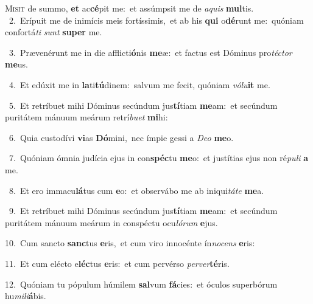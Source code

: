 \lettrine{\initial\textcolor{\initialcolor}{M}}{isit} de summo, \textbf{et} ac\-\textbf{cé}\-pit me:~\star et assúmpsit me de \textit{a}\-\textit{quis} \textbf{mul}\-tis.\\
{\numbfont\textcolor{\numbcolor}{~2.}}~Erípuit me de inimícis meis fortíssimis,~\dagger et ab his \textbf{qui} o\-\textbf{dé}\-runt me:~\star quóniam confortá\textit{ti} \textit{sunt} \textbf{su}\-\textbf{per} me.\par
{\numbfont\textcolor{\numbcolor}{~3.}}~Prævenérunt me in die afflicti\-\textbf{ó}\-nis \textbf{me}\-æ:~\star et factus est Dóminus pro\-\textit{téc}\-\textit{tor} \textbf{me}\-us.\par
{\numbfont\textcolor{\numbcolor}{~4.}}~Et edúxit me in \textbf{la}\-ti\-\textbf{tú}\-dinem:~\star salvum me fecit, quóniam \textit{vó}\-\textit{lu}\textbf{it} me.\par
{\numbfont\textcolor{\numbcolor}{~5.}}~Et retríbuet mihi Dóminus secúndum jus\-\textbf{tí}\-tiam \textbf{me}\-am:~\star et secúndum puritátem mánuum meárum retrí\-\textit{bu}\-\textit{et} \textbf{mi}\-hi:\par
{\numbfont\textcolor{\numbcolor}{~6.}}~Quia custodívi \textbf{vi}\-as \textbf{Dó}\-mini,~\star nec ímpie gessi a \textit{De}\-\textit{o} \textbf{me}\-o.\par
{\numbfont\textcolor{\numbcolor}{~7.}}~Quóniam ómnia judícia ejus in con\-\textbf{spéc}\-tu \textbf{me}\-o:~\star et justítias ejus non ré\-\textit{pu}\-\textit{li} \textbf{a} me.\par
{\numbfont\textcolor{\numbcolor}{~8.}}~Et ero immacu\-\textbf{lá}\-tus cum \textbf{e}\-o:~\star et observábo me ab iniqui\-\textit{tá}\-\textit{te} \textbf{me}\-a.\par
{\numbfont\textcolor{\numbcolor}{~9.}}~Et retríbuet mihi Dóminus secúndum jus\-\textbf{tí}\-tiam \textbf{me}\-am:~\star et secúndum puritátem mánuum meárum in conspéctu ocu\-\textit{ló}\-\textit{rum} \textbf{e}\-jus.\par
{\numbfont\textcolor{\numbcolor}{10.}}~Cum sancto \textbf{sanc}\-tus \textbf{e}\-ris,~\star et cum viro innocénte ín\-\textit{no}\-\textit{cens} \textbf{e}\-ris:\par
{\numbfont\textcolor{\numbcolor}{11.}}~Et cum elécto e\-\textbf{léc}\-tus \textbf{e}\-ris:~\star et cum pervérso \textit{per}\-\textit{ver}\textbf{té}ris.\par
{\numbfont\textcolor{\numbcolor}{12.}}~Quóniam tu pópulum húmilem \textbf{sal}\-vum \textbf{fá}\-cies:~\star et óculos superbórum hu\-\textit{mi}\-\textit{li}\textbf{á}bis.\par
